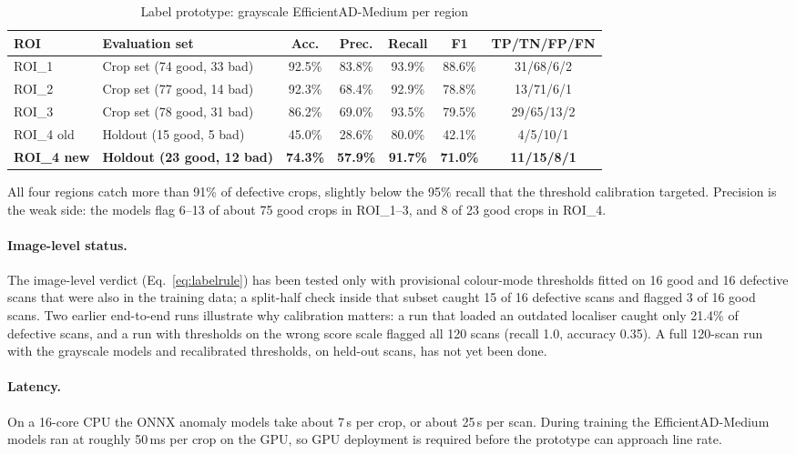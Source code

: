 \begin{table}[htbp]
\centering
\caption{Label prototype: grayscale EfficientAD-Medium per region}
\label{tab:label-roi}
\footnotesize
\begin{tabular}{|l|l|c|c|c|c|c|}
\hline
\textbf{ROI} & \textbf{Evaluation set} & \textbf{Acc.} & \textbf{Prec.} & \textbf{Recall} & \textbf{F1} & \textbf{TP/TN/FP/FN} \\ \hline
ROI\_1 & Crop set (74 good, 33 bad) & 92.5\% & 83.8\% & 93.9\% & 88.6\% & 31/68/6/2 \\ \hline
ROI\_2 & Crop set (77 good, 14 bad) & 92.3\% & 68.4\% & 92.9\% & 78.8\% & 13/71/6/1 \\ \hline
ROI\_3 & Crop set (78 good, 31 bad) & 86.2\% & 69.0\% & 93.5\% & 79.5\% & 29/65/13/2 \\ \hline
ROI\_4 old & Holdout (15 good, 5 bad) & 45.0\% & 28.6\% & 80.0\% & 42.1\% & 4/5/10/1 \\ \hline
\textbf{ROI\_4 new} & \textbf{Holdout (23 good, 12 bad)} & \textbf{74.3\%} & \textbf{57.9\%} & \textbf{91.7\%} & \textbf{71.0\%} & \textbf{11/15/8/1} \\ \hline
\end{tabular}
\end{table}

All four regions catch more than 91\% of defective crops, slightly below the 95\% recall that the threshold calibration targeted. Precision is the weak side: the models flag 6--13 of about 75 good crops in ROI\_1--3, and 8 of 23 good crops in ROI\_4.

\paragraph{Image-level status.} The image-level verdict (Eq.~\eqref{eq:labelrule}) has been tested only with provisional colour-mode thresholds fitted on 16 good and 16 defective scans that were also in the training data; a split-half check inside that subset caught 15 of 16 defective scans and flagged 3 of 16 good scans. Two earlier end-to-end runs illustrate why calibration matters: a run that loaded an outdated localiser caught only 21.4\% of defective scans, and a run with thresholds on the wrong score scale flagged all 120 scans (recall 1.0, accuracy 0.35). A full 120-scan run with the grayscale models and recalibrated thresholds, on held-out scans, has not yet been done.

\paragraph{Latency.} On a 16-core CPU the ONNX anomaly models take about 7\,s per crop, or about 25\,s per scan. During training the EfficientAD-Medium models ran at roughly 50\,ms per crop on the GPU, so GPU deployment is required before the prototype can approach line rate.


